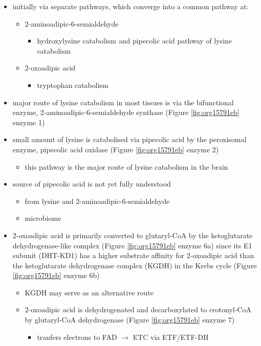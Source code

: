 \documentclass[12pt]{scrartcl}
\begin{document}
\begin{center}
\begin{center}
\begin{itemize}
\item initially via separate pathways, which converge into a common 
pathway at:
\begin{itemize}
\item 2-aminoadipic-6-semialdehyde
\begin{itemize}
\item hydroxylysine catabolism and pipecolic acid pathway of lysine
catabolism
\end{itemize}
\item 2-oxoadipic acid
\begin{itemize}
\item tryptophan catabolism
\end{itemize}
\end{itemize}
\item major route of lysine catabolism in most tissues is via the
bifunctional enzyme, 2-aminoadipic-6-semialdehyde synthase (Figure \ref{fig:org15791eb} enzyme 1)
\item small amount of lysine is catabolised via pipecolic acid by the
peroxisomal enzyme, pipecolic acid oxidase (Figure \ref{fig:org15791eb} enzyme 2)
\begin{itemize}
\item this pathway is the major route of lysine catabolism in the
brain
\end{itemize}
\item source of pipecolic acid is not yet fully understood
\begin{itemize}
\item from lysine and 2-aminoadipic-6-semialdehyde
\item microbiome
\end{itemize}
\item 2-oxoadipic acid is primarily converted to glutaryl-CoA by the
ketoglutarate dehydrogenase-like complex (Figure \ref{fig:org15791eb} enzyme 6a)
since its E1 subunit (DHT-KD1) has a higher substrate affinity for
2-oxoadipic acid than the ketoglutarate dehydrogenase complex (KGDH) in
the Krebs cycle (Figure \ref{fig:org15791eb} enzyme 6b)
\begin{itemize}
\item KGDH may serve as an alternative route
\item 2-oxoadipic acid is dehydrogenated and decarboxylated to
crotonyl-CoA by glutaryl-CoA dehydrogenase (Figure \ref{fig:org15791eb} enzyme 7)
\begin{itemize}
\item tranfers electrons to FAD \(\to\) ETC via ETF/ETF-DH

\end{itemize}
\end{itemize}
\end{itemize}
\end{center}
\end{center}
\end{document}
